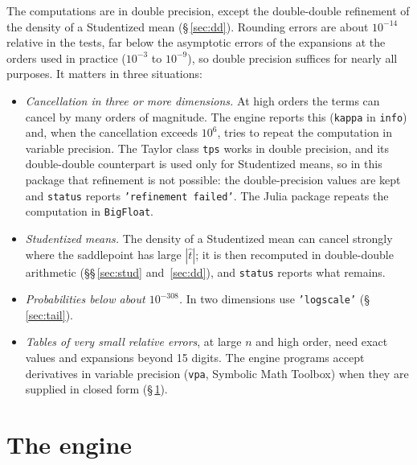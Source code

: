 \documentclass[11pt]{article}
\newcommand{\prog}[1]{\texttt{#1}}
\begin{document}
The computations are in double precision, except the double-double refinement of the density of a
Studentized mean (\S\,\ref{sec:dd}). Rounding errors are about $10^{-14}$ relative in the
tests, far below the asymptotic errors of the expansions at the orders used in practice ($10^{-3}$ to
$10^{-9}$), so double precision suffices for nearly all purposes. It matters in three situations:
\begin{itemize}
\item \emph{Cancellation in three or more dimensions.} At high orders the terms can cancel by many
orders of magnitude. The engine reports this (\prog{kappa} in \prog{info}) and, when the
cancellation exceeds $10^6$, tries to repeat the computation in variable precision. The Taylor class
\prog{tps} works in double precision, and its double-double counterpart is used only for Studentized
means, so in this package that refinement is not possible: the
double-precision values are kept and \prog{status} reports \prog{'refinement failed'}. The Julia
package repeats the computation in \prog{BigFloat}.
\item \emph{Studentized means.} The density of a Studentized mean can cancel strongly where the
saddlepoint has large $|\hat t|$; it is then recomputed in double-double arithmetic
(\S\S\,\ref{sec:stud} and~\ref{sec:dd}), and \prog{status} reports what remains.
\item \emph{Probabilities below about $10^{-308}$.} In two dimensions use \prog{'logscale'}
(\S\,\ref{sec:tail}).
\item \emph{Tables of very small relative errors}, at large $n$ and high order, need exact values and
expansions beyond 15 digits. The engine programs accept derivatives in variable precision
(\prog{vpa}, Symbolic Math Toolbox) when they are supplied in closed form (\S\,\ref{sec:engine}).
\end{itemize}

\section{The engine}\label{sec:engine}
\end{document}

